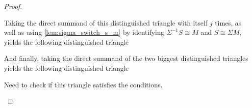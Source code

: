 \begin{proof}
\begin{enumerate}
{\begin{center}
            \end{center}

            Taking the direct summand of this distinguished triangle with itself \( j \) times, as well as using \autoref{lem:sigma_switch_s_m} by identifying \( \Sigma^{-1} S \cong M \) and \( S \cong \Sigma M \), yields the following distinguished triangle
            \begin{center}
            \end{center}

            And finally, taking the direct summand of the two biggest distinguished triangles yields the following distinguished triangle
            \begin{center}
            \end{center}
            Need to check if this triangle satisfies the conditions.

}
\end{enumerate}
\end{proof}
